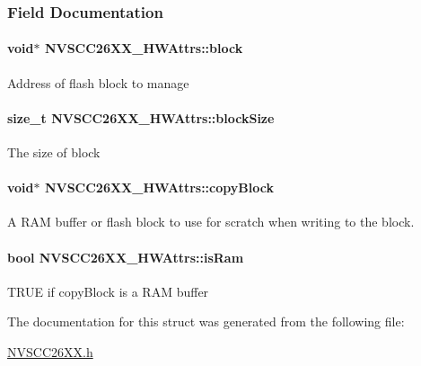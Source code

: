 \subsubsection{Field Documentation}
\paragraph[{block}]{\setlength{\rightskip}{0pt plus 5cm}void$\ast$ N\+V\+S\+C\+C26\+X\+X\+\_\+\+H\+W\+Attrs\+::block}\label{struct_n_v_s_c_c26_x_x___h_w_attrs_ab2e63975579a87dcf24b3a18b04bc479}
Address of flash block to manage 
\paragraph[{block\+Size}]{\setlength{\rightskip}{0pt plus 5cm}size\+\_\+t N\+V\+S\+C\+C26\+X\+X\+\_\+\+H\+W\+Attrs\+::block\+Size}\label{struct_n_v_s_c_c26_x_x___h_w_attrs_aed65c7ea3cd519eb9d9736d27e38088c}
The size of block 
\paragraph[{copy\+Block}]{\setlength{\rightskip}{0pt plus 5cm}void$\ast$ N\+V\+S\+C\+C26\+X\+X\+\_\+\+H\+W\+Attrs\+::copy\+Block}\label{struct_n_v_s_c_c26_x_x___h_w_attrs_a223a3b1a3e5b2fbf51eb913ecc2ec018}
A R\+A\+M buffer or flash block to use for scratch when writing to the block. 
\paragraph[{is\+Ram}]{\setlength{\rightskip}{0pt plus 5cm}bool N\+V\+S\+C\+C26\+X\+X\+\_\+\+H\+W\+Attrs\+::is\+Ram}\label{struct_n_v_s_c_c26_x_x___h_w_attrs_a4cec181505b26bbbacabf9c021189c95}
T\+R\+U\+E if copy\+Block is a R\+A\+M buffer 

The documentation for this struct was generated from the following file\+:\begin{DoxyCompactItemize}
\item 
\hyperlink{_n_v_s_c_c26_x_x_8h}{N\+V\+S\+C\+C26\+X\+X.\+h}\end{DoxyCompactItemize}
